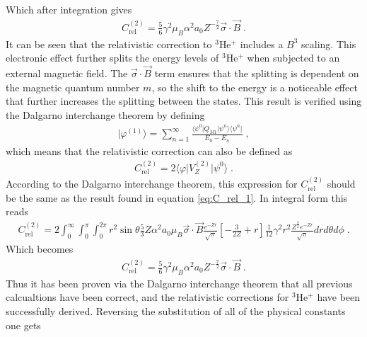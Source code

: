             \normalsize
            \noindent Which after integration gives 
            \begin{align}
                C_{\text{rel}}^{(2)} = \frac{5}{6} \gamma^2 \mu_B \alpha^2 a_0 Z^{-\frac{7}{2}} \vec{\sigma} \cdot \vec{B} \;. \label{eq:C_rel_1}
            \end{align}
            \noindent It can be seen that the relativistic correction to $^3$He$^+$ includes a $B^3$ scaling. This electronic effect further splits the energy levels of $^3$He$^+$ when subjected to an external magnetic field. The $\vec{\sigma} \cdot \vec{B}$ term ensures that the splitting is dependent on the magnetic quantum number $m$, so the shift to the energy is a noticeable effect that further increases the splitting between the states. This result is verified using the Dalgarno interchange theorem by defining
            \begin{align}
                \vert \varphi^{(1)} \rangle = \sum_{n = 1}^\infty \frac{\langle \psi^0 \vert Q_{M1} \vert \psi^n \rangle \langle \psi^n\vert}{E_0 - E_n}\;,
            \end{align}
            \noindent which means that the relativistic correction can also be defined as 
            \begin{align}
                C_{\text{rel}}^{(2)} = 2\langle \varphi \vert V_{Z}^{(2)} \vert \psi^0 \rangle\;.
            \end{align}
            According to the Dalgarno interchange theorem, this expression for $C_{\text{rel}}^{(2)}$ should be the same as the result found in equation \eqref{eq:C_rel_1}. In integral form this reads 
            \footnotesize
            \begin{align}
                C_{\text{rel}}^{(2)} = 2\int_0^\infty \int_0^\pi \int_0^{2\pi} r^2 \sin\theta \frac{5}{3} Z \alpha^2 a_0 \mu_B \vec{\sigma} \cdot \vec{B} \frac{e^{-Zr}}{\sqrt{\pi}} \left[ - \frac{3}{2Z} + r \right] \frac{1}{12} \gamma^2 r^2 \frac{Z^{\frac{3}{2}} e^{-Zr}}{\sqrt{\pi}} dr d\theta d\phi\;.
            \end{align}
            \normalsize Which becomes
            \begin{align}
                C_{\text{rel}}^{(2)} = \frac{5}{6} \gamma^2 \mu_B \alpha^2 a_0 Z^{-\frac{7}{2}} \vec{\sigma} \cdot \vec{B} \;. \label{eq:C_rel_2}
            \end{align}
            \noindent Thus it has been proven via the Dalgarno interchange theorem that all previous calcualtions have been correct, and the relativistic corrections for $^3$He$^+$ have been successfully derived. Reversing the substitution of all of the physical constants one gets 
